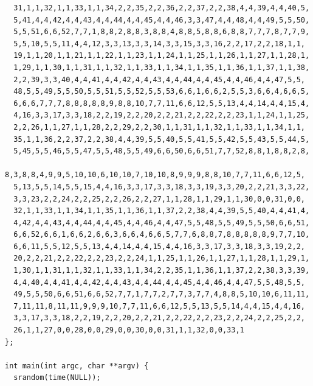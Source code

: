 \documentclass[12pt, a4paper]{article}
\begin{document}
\begin{scriptsize}
\begin{ttfamily}
\begin{lstlisting}
  31,1,1,32,1,1,33,1,1,34,2,2,35,2,2,36,2,2,37,2,2,38,4,4,39,4,4,40,5,
  5,41,4,4,42,4,4,43,4,4,44,4,4,45,4,4,46,3,3,47,4,4,48,4,4,49,5,5,50,
  5,5,51,6,6,52,7,7,1,8,8,2,8,8,3,8,8,4,8,8,5,8,8,6,8,8,7,7,7,8,7,7,9,
  5,5,10,5,5,11,4,4,12,3,3,13,3,3,14,3,3,15,3,3,16,2,2,17,2,2,18,1,1,
  19,1,1,20,1,1,21,1,1,22,1,1,23,1,1,24,1,1,25,1,1,26,1,1,27,1,1,28,1,
  1,29,1,1,30,1,1,31,1,1,32,1,1,33,1,1,34,1,1,35,1,1,36,1,1,37,1,1,38,
  2,2,39,3,3,40,4,4,41,4,4,42,4,4,43,4,4,44,4,4,45,4,4,46,4,4,47,5,5,
  48,5,5,49,5,5,50,5,5,51,5,5,52,5,5,53,6,6,1,6,6,2,5,5,3,6,6,4,6,6,5,
  6,6,6,7,7,7,8,8,8,8,8,9,8,8,10,7,7,11,6,6,12,5,5,13,4,4,14,4,4,15,4,
  4,16,3,3,17,3,3,18,2,2,19,2,2,20,2,2,21,2,2,22,2,2,23,1,1,24,1,1,25,
  2,2,26,1,1,27,1,1,28,2,2,29,2,2,30,1,1,31,1,1,32,1,1,33,1,1,34,1,1,
  35,1,1,36,2,2,37,2,2,38,4,4,39,5,5,40,5,5,41,5,5,42,5,5,43,5,5,44,5,
  5,45,5,5,46,5,5,47,5,5,48,5,5,49,6,6,50,6,6,51,7,7,52,8,8,1,8,8,2,8,
  8,3,8,8,4,9,9,5,10,10,6,10,10,7,10,10,8,9,9,9,8,8,10,7,7,11,6,6,12,5,
  5,13,5,5,14,5,5,15,4,4,16,3,3,17,3,3,18,3,3,19,3,3,20,2,2,21,3,3,22,
  3,3,23,2,2,24,2,2,25,2,2,26,2,2,27,1,1,28,1,1,29,1,1,30,0,0,31,0,0,
  32,1,1,33,1,1,34,1,1,35,1,1,36,1,1,37,2,2,38,4,4,39,5,5,40,4,4,41,4,
  4,42,4,4,43,4,4,44,4,4,45,4,4,46,4,4,47,5,5,48,5,5,49,5,5,50,6,6,51,
  6,6,52,6,6,1,6,6,2,6,6,3,6,6,4,6,6,5,7,7,6,8,8,7,8,8,8,8,8,9,7,7,10,
  6,6,11,5,5,12,5,5,13,4,4,14,4,4,15,4,4,16,3,3,17,3,3,18,3,3,19,2,2,
  20,2,2,21,2,2,22,2,2,23,2,2,24,1,1,25,1,1,26,1,1,27,1,1,28,1,1,29,1,
  1,30,1,1,31,1,1,32,1,1,33,1,1,34,2,2,35,1,1,36,1,1,37,2,2,38,3,3,39,
  4,4,40,4,4,41,4,4,42,4,4,43,4,4,44,4,4,45,4,4,46,4,4,47,5,5,48,5,5,
  49,5,5,50,6,6,51,6,6,52,7,7,1,7,7,2,7,7,3,7,7,4,8,8,5,10,10,6,11,11,
  7,11,11,8,11,11,9,9,9,10,7,7,11,6,6,12,5,5,13,5,5,14,4,4,15,4,4,16,
  3,3,17,3,3,18,2,2,19,2,2,20,2,2,21,2,2,22,2,2,23,2,2,24,2,2,25,2,2,
  26,1,1,27,0,0,28,0,0,29,0,0,30,0,0,31,1,1,32,0,0,33,1
};

int main(int argc, char **argv) {
  srandom(time(NULL));
  

\end{lstlisting}
\end{ttfamily}
\end{scriptsize}
\end{document}
